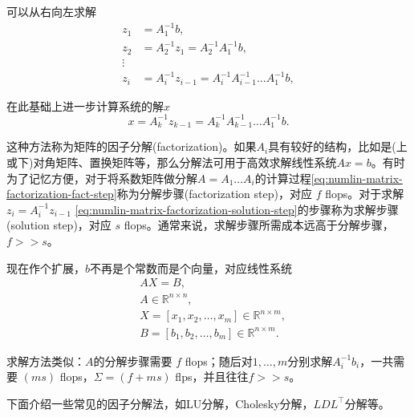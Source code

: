可以从右向左求解
\begin{equation}
\label{eq:numlin-matrix-factorization-solution-step}
\begin{split}
    z_{1} & = A_{1}^{-1} b, \\
    z_{2} & = A_{2}^{-1} z_{1} = A_{2}^{-1} A_{1}^{-1} b, \\
    \vdots & \\
    z_{i} &= A_{i}^{-1} z_{i-1} = A_{i}^{-1} A_{i-1}^{-1} \ldots A_{1}^{-1} b,
\end{split}
\end{equation}

在此基础上进一步计算系统的解$x$
\begin{equation*}
  x = A_{k}^{-1} z_{k-1} = A_{k}^{-1} A_{k-1}^{-1} \ldots A_{1}^{-1} b.
\end{equation*}

这种方法称为矩阵的因子分解(factorization)。如果$A_{i}$具有较好的结构，比如是(上或下)对角矩阵、置换矩阵等，那么分解法可用于高效求解线性系统$A x = b$。有时为了记忆方便，对于将系数矩阵做分解$A=A_{1} \ldots A_{i}$的计算过程\eqref{eq:numlin-matrix-factorization-fact-step}称为分解步骤(factorization step)，对应 $f$ flops。对于求解$z_{i} = A_{i}^{-1} z_{i-1}$ \eqref{eq:numlin-matrix-factorization-solution-step}的步骤称为求解步骤(solution step)，对应 $s$ flops。通常来说，求解步骤所需成本远高于分解步骤，$f >> s$。

现在作个扩展，$b$不再是个常数而是个向量，对应线性系统
\begin{equation*}
\begin{split}
  & A X = B,  \\
  & A \in \mathbb{R}^{n \times n}, \\
  & X = \left[ x_{1}, x_{2}, \ldots, x_{m} \right] \in \mathbb{R}^{ n \times m}, \\
  & B = \left[ b_{1}, b_{2}, \ldots, b_{m} \right] \in \mathbb{R}^{ n \times m}.
\end{split}
\end{equation*}

求解方法类似：$A$的分解步骤需要 $f$ flops；随后对$1,\ldots,m$分别求解$A_{i}^{-1} b_{i}$，一共需要 $(m s)$ flops，$\Sigma = \left( f + ms \right)$ flps，并且往往$f >> s$。

下面介绍一些常见的因子分解法，如LU分解，Cholesky分解，$LDL^{\top}$分解等。

